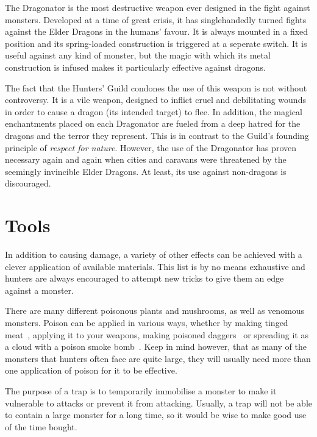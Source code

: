 The Dragonator is the most destructive weapon ever designed in the fight against monsters. Developed at a time of great crisis, it has singlehandedly turned fights against the Elder Dragons in the humans' favour. It is always mounted in a fixed position and its spring-loaded construction is triggered at a seperate switch. It is useful against any kind of monster, but the magic with which its metal construction is infused makes it particularly effective against dragons.

The fact that the Hunters' Guild condones the use of this weapon is not without controversy. It is a vile weapon, designed to inflict cruel and debilitating wounds in order to cause a dragon (its intended target) to flee. In addition, the magical enchantments placed on each Dragonator are fueled from a deep hatred for the dragons and the terror they represent. This is in contrast to the Guild's founding principle of \emph{respect for nature}. However, the use of the Dragonator has proven necessary again and again when cities and caravans were threatened by the seemingly invincible Elder Dragons. At least, its use against non-dragons is discouraged.


\section{Tools}
In addition to causing damage, a variety of other effects can be achieved with a clever application of available materials. This list is by no means exhaustive and hunters are always encouraged to attempt new tricks to give them an edge against a monster.

There are many different poisonous plants and mushrooms, as well as venomous monsters. Poison can be applied in various ways, whether by making tinged meat~, applying it to your weapons, making poisoned daggers~ or spreading it as a cloud with a poison smoke bomb~. Keep in mind however, that as many of the monsters that hunters often face are quite large, they will usually need more than one application of poison for it to be effective.

The purpose of a trap is to temporarily immobilise a monster to make it vulnerable to attacks or prevent it from attacking. Usually, a trap will not be able to contain a large monster for a long time, so it would be wise to make good use of the time bought.

